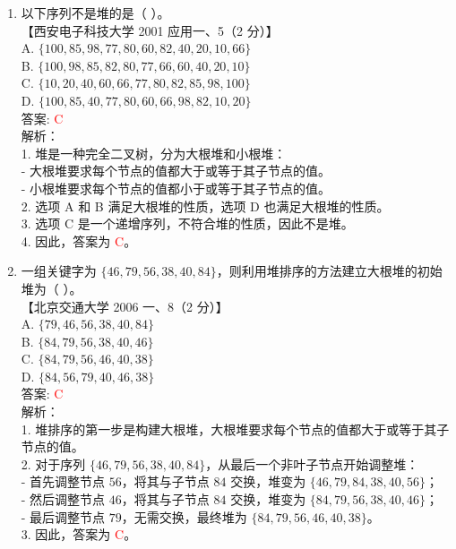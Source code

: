 \documentclass[lang=cn,newtx,10pt,scheme=chinese]{../../../elegantbook}
\begin{document}
\begin{enumerate}
    \item 以下序列不是堆的是（ ）。\\
    【西安电子科技大学 2001 应用一、5（2 分）】\\  

    A. $\{100, 85, 98, 77, 80, 60, 82, 40, 20, 10, 66\}$ \\  

    B. $\{100, 98, 85, 82, 80, 77, 66, 60, 40, 20, 10\}$ \\  

    C. $\{10, 20, 40, 60, 66, 77, 80, 82, 85, 98, 100\}$ \\  

    D. $\{100, 85, 40, 77, 80, 60, 66, 98, 82, 10, 20\}$ \\  

    答案: \textcolor{red}{C} \\

    解析：\\
    1. 堆是一种完全二叉树，分为大根堆和小根堆：\\
       - 大根堆要求每个节点的值都大于或等于其子节点的值。\\
       - 小根堆要求每个节点的值都小于或等于其子节点的值。\\
    2. 选项 A 和 B 满足大根堆的性质，选项 D 也满足大根堆的性质。\\
    3. 选项 C 是一个递增序列，不符合堆的性质，因此不是堆。\\
    4. 因此，答案为 \textcolor{red}{C}。\\

    \item 一组关键字为 $\{46, 79, 56, 38, 40, 84\}$，则利用堆排序的方法建立大根堆的初始堆为（ ）。\\
    【北京交通大学 2006 一、8（2 分）】\\  

    A. $\{79, 46, 56, 38, 40, 84\}$ \\  

    B. $\{84, 79, 56, 38, 40, 46\}$ \\  

    C. $\{84, 79, 56, 46, 40, 38\}$ \\  

    D. $\{84, 56, 79, 40, 46, 38\}$ \\  

    答案: \textcolor{red}{C} \\

    解析：\\
    1. 堆排序的第一步是构建大根堆，大根堆要求每个节点的值都大于或等于其子节点的值。\\
    2. 对于序列 $\{46, 79, 56, 38, 40, 84\}$，从最后一个非叶子节点开始调整堆：\\
       - 首先调整节点 $56$，将其与子节点 $84$ 交换，堆变为 $\{46, 79, 84, 38, 40, 56\}$；\\
       - 然后调整节点 $46$，将其与子节点 $84$ 交换，堆变为 $\{84, 79, 56, 38, 40, 46\}$；\\
       - 最后调整节点 $79$，无需交换，最终堆为 $\{84, 79, 56, 46, 40, 38\}$。\\
    3. 因此，答案为 \textcolor{red}{C}。\\


\end{enumerate}
\end{document}
